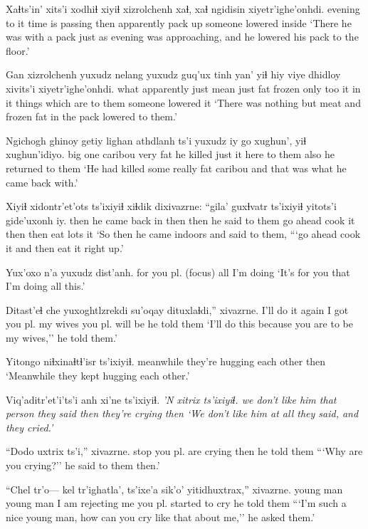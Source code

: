\documentclass[12pt]{article}
\begin{document}
\gll Xaɬts'in' xits'i xodhiɬ xiyiɬ xizrolchenh xaɬ, xaɬ ngidisin xiyetr'ighe'onhdi.
evening {to it} {time is passing} then apparently pack {} up {someone lowered inside}
\glt `There he was with a pack just as evening was approaching, and he lowered his pack to the floor.'
\glend

\gll Gan xizrolchenh yuxudz nelang yuxudz guq'ux tinh yan' yiɬ hiy viye dhidloy xivits'i xiyetr'ighe'onhdi.
what apparently just mean just fat frozen only too it {in it} {things which are} {to them} {someone lowered it}
\glt `There was nothing but meat and frozen fat in the pack lowered to them.'
\glend

\gll Ngichogh ghinoy getiy lighan athdlanh ts'i yuxudz iy go xughun', yiɬ xughun'idiyo.
{big one} caribou very fat {he killed} {} just it here {to them} also {he returned to them}
\glt `He had killed some really fat caribou and that was what he came back with.'
\glend

\gll Xiyiɬ xidontr'et'ots ts'ixiyiɬ xiɬdik dixivazrne: ``gila' guxɬvatr ts'ixiyiɬ yitots'i {gide'uxonh} iy.
then {he came back in} then then {he said to them} {go ahead} {cook it} then then {eat lots} it
\glt `So then he came indoors and said to them, ```go ahead cook it and then eat it right up.'
\glend

\gll Yux'oxo n'a yuxudz dist'anh.
{for you pl.} {(focus)} all {I'm doing}
\glt `It's for you that I'm doing all this.'
\glend

\gll Ditast'eɬ che yuxoghtlzrekdi su'oqay dituxlaɬdi,'' xivazrne.
{I'll do it} again {I got you pl.} {my wives} {you pl. will be} {he told them}
\glt `I'll do this because you are to be my wives,'' he told them.'
\glend

\gll Yitongo niɬxinaɬtɬ'isr ts'ixiyiɬ.
meanwhile {they're hugging each other} then
\glt `Meanwhile they kept hugging each other.'
\glend

\gll Viq'aditr'et'i'ts'i anh xi'ne ts'ixiyiɬ. \em 'N xitrix ts'ixiyiɬ.
{we don't like him} {that person} {they said} then {} {they're crying} then
\glt `We don't like him at all they said, and they cried.'
\glend

\gll ``Dodo uxtrix ts'i,'' xivazrne.
stop {you pl. are crying} then {he told them}
\glt ```Why are you crying?'' he said to them then.'
\glend

\gll ``Chel tr'o--- kel tr'ighatla', ts'ixe'a sik'o' yitidhuxtrax,'' xivazrne.
{young man} {} {young man} {I am} {} {rejecting me} {you pl. started to cry} {he told them}
\glt ```I'm such a nice young man, how can you cry like that about me,'' he asked them.'
\glend
\end{document}
